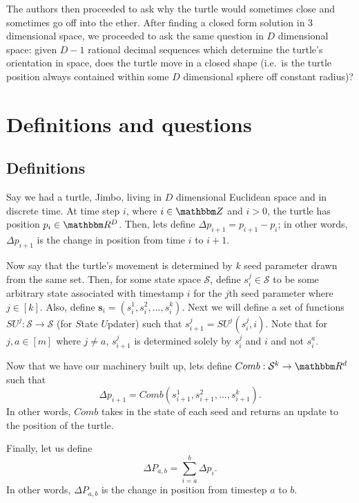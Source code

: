 \documentclass[11pt,titlepage]{article}
\newcommand{\combWithState}[1]{Comb\left(s^1_{#1}, s^2_{#1}, ..., s^k_{#1}\right)}
\begin{document}
The authors then proceeded to ask why the turtle would sometimes close and sometimes
go off into the ether. After finding a closed form solution in 3 dimensional space,
we proceeded to ask the same question in $D$ dimensional space: given $D - 1$ 
rational decimal sequences which determine the turtle's orientation in space,
does the turtle move in a closed shape (i.e.\ is the turtle position always contained
within some $D$ dimensional sphere off constant radius)?


\pagebreak
\section{Definitions and questions}
\subsection{Definitions}
Say we had a turtle, Jimbo, living in $D$ dimensional Euclidean
space and in discrete time. At time step $i$, where $i \in \Z$ and $i > 0$,
the turtle has position $p_i \in \R^D$.
Then, lets define $\Delta p_{i+1} = p_{i+1} - p_i$; in other words, $\Delta p_{i+1}$ is the change in position from time $i$ to $i + 1$.

Now say that the turtle's movement is determined by $k$ seed parameter drawn from
the same set. Then, for some state space $\mathcal{S}$,
define $s_i^j \in \mathcal{S}$ to be some arbitrary
state associated with timestamp $i$ for the $j$th seed parameter where $j \in [k]$.
Also, define $\pmb{s}_i = (s_i^1, s_i^2, ..., s_i^k)$.
Next we will define a set of functions $SU^j: \mathcal{S} \rightarrow \mathcal{S}$
(for $S$tate $U$pdater) such that $s_{i + 1}^j = SU^j(s_i^j, i)$. Note that for
$j, a \in [m]$ where $j \neq a$, $s_{i+1}^j$ is determined solely by $s_i^j$ and $i$ and not
$s_i^a$.

Now that we have our machinery built up, lets define $Comb: \mathcal{S}^k \rightarrow \R^d$ such that
$$
  \Delta p_{i + 1} = \combWithState{i + 1}.
$$
In other words, $Comb$ takes in the state of each seed and
returns an update to the position of the turtle.

Finally, let us define
$$
  \Delta P_{a, b} = \sum_{i = a}^{b} \Delta p_i.
$$
In other words, $\Delta P_{a, b}$ is the change in position from timestep $a$ to $b$.
\end{document}
